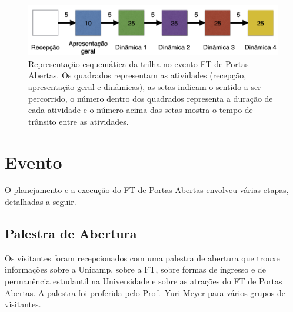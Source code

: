\documentclass[
  letterpaper,
  DIV=11,
  numbers=noendperiod]{scrreprt}
\begin{document}
\begin{figure}[H]

{\centering \includegraphics[width=0.7\linewidth,height=\textheight,keepaspectratio]{atividades/dinamica.png}

}

\caption{Representação esquemática da trilha no evento FT de Portas
Abertas. Os quadrados representam as atividades (recepção, apresentação
geral e dinâmicas), as setas indicam o sentido a ser percorrido, o
número dentro dos quadrados representa a duração de cada atividade e o
número acima das setas mostra o tempo de trânsito entre as atividades.}

\end{figure}%


\chapter{Evento}\label{evento}

O planejamento e a execução do FT de Portas Abertas envolveu várias
etapas, detalhadas a seguir.

\section{Palestra de Abertura}\label{palestra-de-abertura}

Os visitantes foram recepcionados com uma palestra de abertura que
trouxe informações sobre a Unicamp, sobre a FT, sobre formas de ingresso
e de permanência estudantil na Universidade e sobre as atrações do FT de
Portas Abertas. A \href{FTPA-palestra-abertura.pdf}{palestra} foi
proferida pelo Prof.~Yuri Meyer para vários grupos de visitantes.
\end{document}
